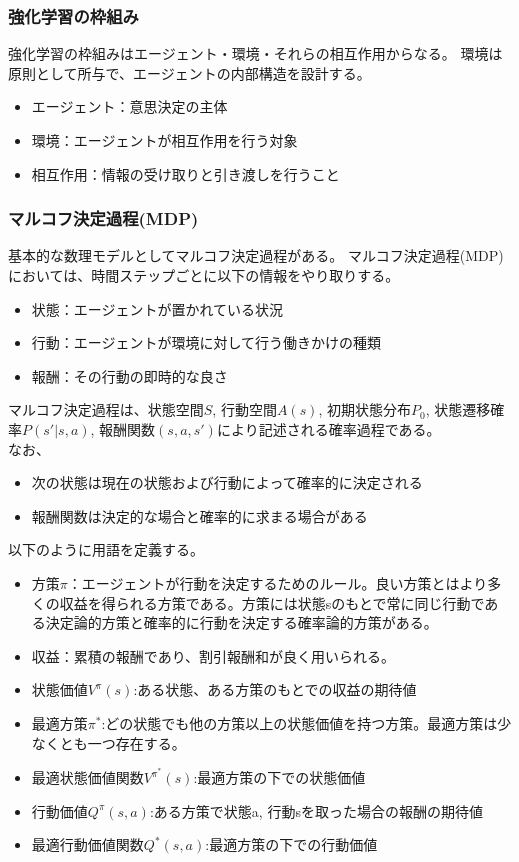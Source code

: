 \documentclass[]{jarticle}
\begin{document}
\subsubsection*{強化学習の枠組み}

強化学習の枠組みはエージェント・環境・それらの相互作用からなる。
環境は原則として所与で、エージェントの内部構造を設計する。
\begin{itemize}
	\item エージェント：意思決定の主体　
	\item 環境：エージェントが相互作用を行う対象
	\item 相互作用：情報の受け取りと引き渡しを行うこと
\end{itemize}

\subsubsection*{マルコフ決定過程(MDP)}
基本的な数理モデルとしてマルコフ決定過程がある。
マルコフ決定過程(MDP)においては、時間ステップごとに以下の情報をやり取りする。
\begin{itemize}
	\item 状態：エージェントが置かれている状況
	\item 行動：エージェントが環境に対して行う働きかけの種類
	\item 報酬：その行動の即時的な良さ
\end{itemize}
マルコフ決定過程は、状態空間$S$, 行動空間$A(s)$, 初期状態分布$P_0$, 状態遷移確率$P(s'|s,a)$, 報酬関数$(s,a,s')$により記述される確率過程である。\\
なお、
\begin{itemize}
	\item 次の状態は現在の状態および行動によって確率的に決定される
	\item 報酬関数は決定的な場合と確率的に求まる場合がある
\end{itemize}
以下のように用語を定義する。
\begin{itemize}
	\item 方策$\pi$：エージェントが行動を決定するためのルール。良い方策とはより多くの収益を得られる方策である。方策には状態sのもとで常に同じ行動である決定論的方策と確率的に行動を決定する確率論的方策がある。
	\item 収益：累積の報酬であり、割引報酬和が良く用いられる。
	\item 状態価値$V^{\pi}(s)$:ある状態、ある方策のもとでの収益の期待値
	\item 最適方策$\pi^*$:どの状態でも他の方策以上の状態価値を持つ方策。最適方策は少なくとも一つ存在する。
    \item 最適状態価値関数$V^{\pi^*}(s)$:最適方策の下での状態価値
    \item 行動価値$Q^\pi(s,a)$:ある方策で状態a, 行動sを取った場合の報酬の期待値
    \item 最適行動価値関数$Q^*(s,a)$:最適方策の下での行動価値
\end{itemize}
\end{document}
